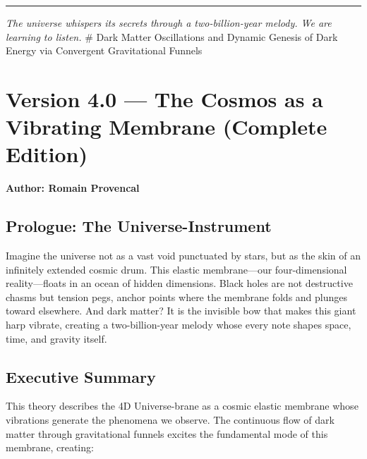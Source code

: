 \documentclass[
  11pt,
]{report}
\begin{document}
\begin{center}\rule{0.5\linewidth}{0.5pt}\end{center}

\emph{The universe whispers its secrets through a two-billion-year
melody. We are learning to listen.} \newpage \# Dark Matter Oscillations
and Dynamic Genesis of Dark Energy via Convergent Gravitational Funnels

\section{Version 4.0 --- The Cosmos as a Vibrating Membrane (Complete
Edition)}\label{version-4.0-the-cosmos-as-a-vibrating-membrane-complete-edition}

\textbf{Author: Romain Provencal}

\subsection{Prologue: The
Universe-Instrument}\label{prologue-the-universe-instrument}

Imagine the universe not as a vast void punctuated by stars, but as the
skin of an infinitely extended cosmic drum. This elastic membrane---our
four-dimensional reality---floats in an ocean of hidden dimensions.
Black holes are not destructive chasms but tension pegs, anchor points
where the membrane folds and plunges toward elsewhere. And dark matter?
It is the invisible bow that makes this giant harp vibrate, creating a
two-billion-year melody whose every note shapes space, time, and gravity
itself.

\subsection{Executive Summary}\label{executive-summary}

This theory describes the 4D Universe-brane as a cosmic elastic membrane
whose vibrations generate the phenomena we observe. The continuous flow
of dark matter through gravitational funnels excites the fundamental
mode of this membrane, creating:
\end{document}
